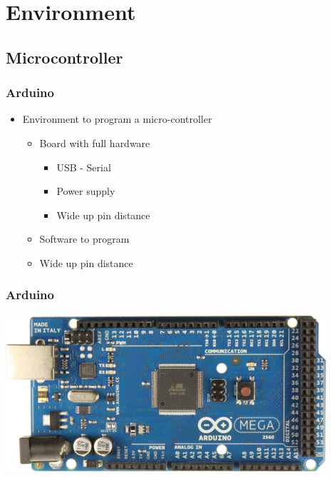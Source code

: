 \section{Environment}


\subsection{Microcontroller}
\frame
{
\frametitle{Arduino}

\begin{itemize}
\item Environment to program a micro-controller
	\begin{itemize}
	\item Board with full hardware
		\begin{itemize}
		\item USB - Serial
		\item Power supply
		\item Wide up pin distance
		\end{itemize}
	\item Software to program
	\item Wide up pin distance
	\end{itemize}
\end{itemize}
}


\frame
{
\frametitle{Arduino}
\includegraphics[width=\textwidth]{picturesArduino/arduinoMega2560_R3_Front.jpg}
}


